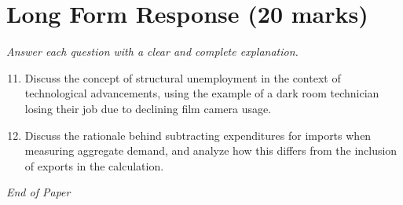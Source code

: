 \documentclass[12pt]{article}
\begin{document}
\section*{Long Form Response (20 marks)}
\textit{Answer each question with a clear and complete explanation.}
\begin{enumerate}[label=\arabic*.]
\setcounter{enumi}{10}
\item Discuss the concept of structural unemployment in the context of technological advancements, using the example of a dark room technician losing their job due to declining film camera usage.
\item Discuss the rationale behind subtracting expenditures for imports when measuring aggregate demand, and analyze how this differs from the inclusion of exports in the calculation.
\end{enumerate}

\vfill
\noindent\textit{End of Paper}
\end{document}
